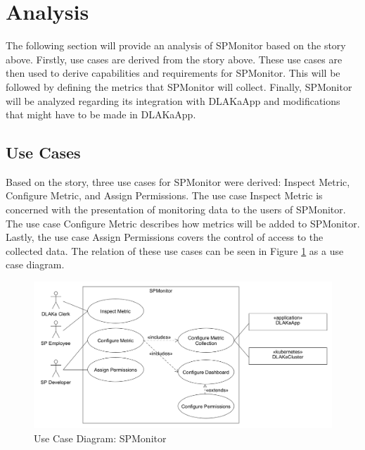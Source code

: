 \section{Analysis}
\label{sec:analysis}

The following section will provide an analysis of SPMonitor based on the
story above. Firstly, use cases are derived from the story above.
These use cases are then used to derive capabilities and requirements for
SPMonitor. This will be followed by defining the metrics that SPMonitor will
collect. Finally, SPMonitor will be analyzed regarding its integration with
DLAKaApp and modifications that might have to be made in DLAKaApp.

\subsection{Use Cases}

Based on the story, three use cases for SPMonitor were derived: Inspect
Metric, Configure Metric, and Assign Permissions. The use case Inspect Metric
is concerned with the presentation of monitoring data to the users of
SPMonitor. The use case Configure Metric describes how metrics will be added to
SPMonitor. Lastly, the use case Assign Permissions covers the control of access
to the collected data. The relation of these use cases can be seen in Figure
\ref{fig:use_case_diagram_spmonitor} as a use case diagram.

\begin{figure}[tb]
  \centering
  \includegraphics[width=\textwidth]{figures/6.1_use_case_spmonitor.png}
  \caption{Use Case Diagram: SPMonitor}
  \label{fig:use_case_diagram_spmonitor}
\end{figure}

